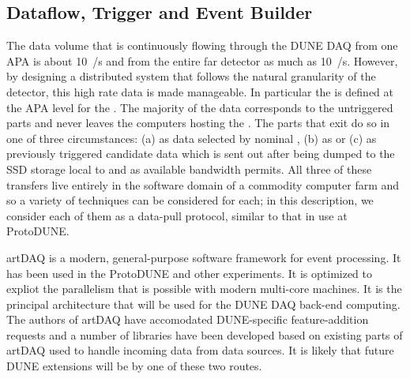 
\subsection{Dataflow, Trigger and Event Builder}
\label{sec:fd-daq-hlt}


The data volume that is continuously flowing through the DUNE
  DAQ from one APA is about \SI{10}{\GB/\s}
and from the entire far detector as much as \SI{10}{\TB/\s}.
However, by designing a distributed system that follows the natural
granularity of the detector, this high rate data is made manageable.
In particular the  is defined at the APA level for
the  .
The majority of the data corresponds to the untriggered parts and
never leaves the computers hosting the .
The parts that exit do so in one of three circumstances: (a) as data
selected by nominal , (b) as  or
(c) as previously triggered  candidate data which is
sent out after being dumped to the SSD storage local to
 and as available bandwidth permits. 
All three of these transfers live entirely in the software domain of a
commodity computer farm and so a variety of techniques can be
considered for each; in this description, we consider each of them as
a data-pull protocol, similar to that in use at ProtoDUNE.

artDAQ is a modern, general-purpose software framework for event
processing. 
It has been used in the ProtoDUNE and other experiments.
It is optimized to expliot the parallelism that is possible with
modern multi-core machines. 
It is the principal architecture that will be used for the DUNE DAQ
back-end computing.
The authors of artDAQ have accomodated DUNE-specific feature-addition
requests and a number of libraries have been developed based on
existing parts of artDAQ used to handle incoming data from data
sources. 
It is likely that future DUNE extensions will be by one of these two
routes.

